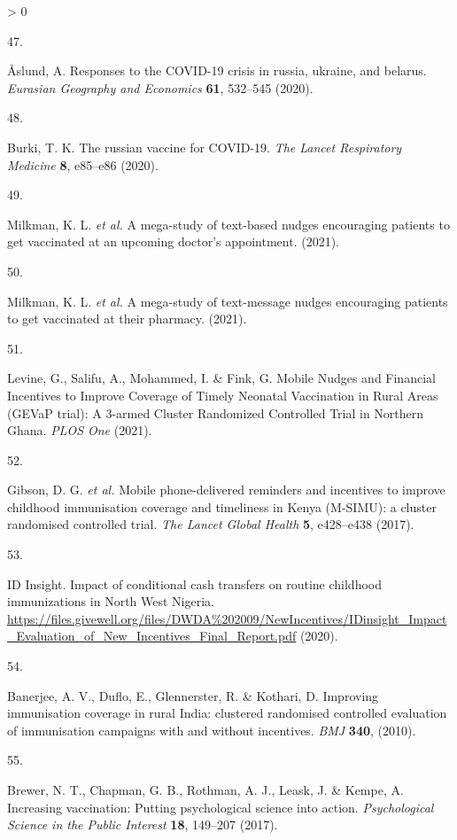 \documentclass[
  12pt,
]{article}
\newlength{\cslhangindent}
\newlength{\csllabelwidth}
\newenvironment{CSLReferences}[2] %
 {%
  \setlength{\parindent}{0pt}
  \ifodd #1 \everypar{\setlength{\hangindent}{\cslhangindent}}\ignorespaces\fi
  \ifnum #2 > 0
  \setlength{\parskip}{#2\baselineskip}
  \fi
 }%
 {}
\newcommand{\CSLLeftMargin}[1]{\parbox[t]{\csllabelwidth}{#1}}
\newcommand{\CSLRightInline}[1]{\parbox[t]{\linewidth - \csllabelwidth}{#1}\break}
\begin{document}
\begin{CSLReferences}{0}{0}
\leavevmode\hypertarget{ref-aaslund2020responses}{}%
\CSLLeftMargin{47. }
\CSLRightInline{Åslund, A. Responses to the COVID-19 crisis in russia, ukraine, and belarus. \emph{Eurasian Geography and Economics} \textbf{61}, 532--545 (2020).}

\leavevmode\hypertarget{ref-burki2020russian}{}%
\CSLLeftMargin{48. }
\CSLRightInline{Burki, T. K. The russian vaccine for COVID-19. \emph{The Lancet Respiratory Medicine} \textbf{8}, e85--e86 (2020).}

\leavevmode\hypertarget{ref-milkmanetal2021a}{}%
\CSLLeftMargin{49. }
\CSLRightInline{Milkman, K. L. \emph{et al.} A mega-study of text-based nudges encouraging patients to get vaccinated at an upcoming doctor's appointment. (2021).}

\leavevmode\hypertarget{ref-milkmanetal2021b}{}%
\CSLLeftMargin{50. }
\CSLRightInline{Milkman, K. L. \emph{et al.} A mega-study of text-message nudges encouraging patients to get vaccinated at their pharmacy. (2021).}

\leavevmode\hypertarget{ref-levine2021}{}%
\CSLLeftMargin{51. }
\CSLRightInline{Levine, G., Salifu, A., Mohammed, I. \& Fink, G. {Mobile Nudges and Financial Incentives to Improve Coverage of Timely Neonatal Vaccination in Rural Areas (GEVaP trial): A 3-armed Cluster Randomized Controlled Trial in Northern Ghana}. \emph{PLOS One} (2021).}

\leavevmode\hypertarget{ref-gibsonetal2017}{}%
\CSLLeftMargin{52. }
\CSLRightInline{Gibson, D. G. \emph{et al.} {Mobile phone-delivered reminders and incentives to improve childhood immunisation coverage and timeliness in Kenya (M-SIMU): a cluster randomised controlled trial}. \emph{The Lancet Global Health} \textbf{5}, e428--e438 (2017).}

\leavevmode\hypertarget{ref-idinsight}{}%
\CSLLeftMargin{53. }
\CSLRightInline{ID Insight. {Impact of conditional cash transfers on routine childhood immunizations in North West Nigeria}. \url{https://files.givewell.org/files/DWDA\%202009/NewIncentives/IDinsight_Impact_Evaluation_of_New_Incentives_Final_Report.pdf} (2020).}

\leavevmode\hypertarget{ref-Banerjee2010}{}%
\CSLLeftMargin{54. }
\CSLRightInline{Banerjee, A. V., Duflo, E., Glennerster, R. \& Kothari, D. {Improving immunisation coverage in rural India: clustered randomised controlled evaluation of immunisation campaigns with and without incentives}. \emph{BMJ} \textbf{340}, (2010).}

\leavevmode\hypertarget{ref-brewer2017increasing}{}%
\CSLLeftMargin{55. }
\CSLRightInline{Brewer, N. T., Chapman, G. B., Rothman, A. J., Leask, J. \& Kempe, A. Increasing vaccination: Putting psychological science into action. \emph{Psychological Science in the Public Interest} \textbf{18}, 149--207 (2017).}


\end{CSLReferences}
\end{document}
